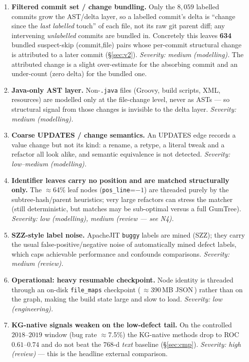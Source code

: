 \documentclass[11pt,a4paper]{article}
\newcommand{\code}[1]{\texttt{#1}}
\newcommand{\edge}[1]{\textsc{#1}}
\begin{document}
	\begin{enumerate}[nosep,label=\textbf{C\arabic*.}]
		\item \textbf{Filtered commit set / change bundling.} Only the $8{,}059$
		labelled commits grow the AST/delta layer, so a labelled commit's delta is
		``change since the \emph{last labelled} touch'' of each file, not its raw git
		parent diff; any intervening \emph{unlabelled} commits are bundled in. Concretely
		this leaves \textbf{634} bundled suspect-skip (commit,file) pairs whose
		per-commit structural change is attributed to a later commit (\S\ref{sec:v2}).
		\emph{Severity: medium (modelling).} The attributed change is a slight
		over-estimate for the absorbing commit and an under-count (zero delta) for the
		bundled one.
		\item \textbf{Java-only AST layer.} Non-\texttt{.java} files (Groovy, build
		scripts, XML, resources) are modelled only at the file-change level, never as
		ASTs --- so structural signal from those changes is invisible to the delta
		layer. \emph{Severity: medium (modelling).}
		\item \textbf{Coarse \edge{UPDATES} / change semantics.} An \edge{UPDATES}
		edge records a value change but not its kind: a rename, a retype, a literal
		tweak and a refactor all look alike, and semantic equivalence is not detected.
		\emph{Severity: low--medium (modelling).}
		\item \textbf{Identifier leaves carry no position and are matched
		structurally only.} The $\approx$64\% leaf nodes (\code{pos\_line}=$-1$) are
		threaded purely by the subtree-hash/parent heuristics; very large refactors can
		stress the matcher (still deterministic, but matches may be sub-optimal versus a
		full GumTree). \emph{Severity: low (modelling), medium (review --- see N4).}
		\item \textbf{SZZ-style label noise.} ApacheJIT \code{buggy} labels are mined
		(SZZ); they carry the usual false-positive/negative noise of automatically
		mined defect labels, which caps achievable performance and confounds
		comparisons. \emph{Severity: medium (review).}
		\item \textbf{Operational: heavy resumable checkpoint.} Node identity is
		threaded through an on-disk \texttt{file\_maps} checkpoint (\,$\approx$390\,MB
		JSON\,) rather than on the graph, making the build state large and slow to load.
		\emph{Severity: low (engineering).}
		\item \textbf{KG-native signals weaken on the low-defect tail.} On the
		controlled $2018$--$2019$ window (bug rate $\approx$7.5\%) the KG-native methods
		drop to ROC $0.61$--$0.74$ and do not beat the $768$-d \emph{text} baseline
		(\S\ref{sec:cmp}). \emph{Severity: high (review)} --- this is the headline
		external comparison.
	\end{enumerate}
\end{document}
